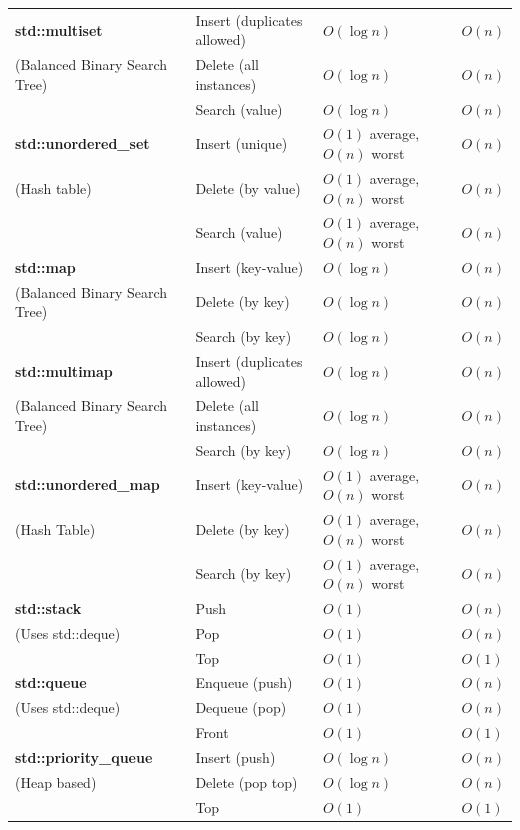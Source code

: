 \documentclass[../main]{subfiles}
\begin{document}
\begin{longtable}{|l|l|l|l|}
\textbf{std::multiset} & Insert (duplicates allowed) & $O(\log n)$ & $O(n)$ \\
(Balanced Binary Search Tree) & Delete (all instances) & $O(\log n)$ & $O(n)$ \\
 & Search (value) & $O(\log n)$ & $O(n)$ \\
\hline

\textbf{std::unordered\_set} & Insert (unique) & $O(1)$ average, $O(n)$ worst & $O(n)$ \\
(Hash table) & Delete (by value) & $O(1)$ average, $O(n)$ worst & $O(n)$ \\
 & Search (value) & $O(1)$ average, $O(n)$ worst & $O(n)$ \\
\hline

\textbf{std::map} & Insert (key-value) & $O(\log n)$ & $O(n)$ \\
(Balanced Binary Search Tree) & Delete (by key) & $O(\log n)$ & $O(n)$ \\
 & Search (by key) & $O(\log n)$ & $O(n)$ \\
\hline

\textbf{std::multimap} & Insert (duplicates allowed) & $O(\log n)$ & $O(n)$ \\
(Balanced Binary Search Tree) & Delete (all instances) & $O(\log n)$ & $O(n)$ \\
 & Search (by key) & $O(\log n)$ & $O(n)$ \\
\hline

\textbf{std::unordered\_map} & Insert (key-value) & $O(1)$ average, $O(n)$ worst & $O(n)$ \\
(Hash Table) & Delete (by key) & $O(1)$ average, $O(n)$ worst & $O(n)$ \\
 & Search (by key) & $O(1)$ average, $O(n)$ worst & $O(n)$ \\
\hline

\textbf{std::stack} & Push & $O(1)$ & $O(n)$ \\
(Uses std::deque) & Pop & $O(1)$ & $O(n)$ \\
 & Top & $O(1)$ & $O(1)$ \\
\hline

\textbf{std::queue} & Enqueue (push) & $O(1)$ & $O(n)$ \\
(Uses std::deque) & Dequeue (pop) & $O(1)$ & $O(n)$ \\
 & Front & $O(1)$ & $O(1)$ \\
\hline

\textbf{std::priority\_queue} & Insert (push) & $O(\log n)$ & $O(n)$ \\
(Heap based) & Delete (pop top) & $O(\log n)$ & $O(n)$ \\
 & Top & $O(1)$ & $O(1)$ \\
\hline
\end{longtable}
\normalsize
\end{document}
